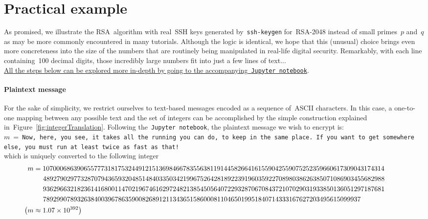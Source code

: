 \documentclass{article}
\begin{document}
\section{Practical example}
\label{sec::example}

\noindent As promised, we illustrate the RSA~algorithm with real~SSH keys generated by~\texttt{ssh-keygen} for~RSA-2048 instead of small primes~$p$ and~$q$ as may be more commonly encountered in many tutorials.  Although the logic is identical, we hope that this (unusual) choice brings even more concreteness into the size of the numbers that are routinely being manipulated in real-life digital security. Remarkably, with each line containing~100 decimal digits, those incredibly large numbers fit into just a few lines of text... \\

\noindent \href{https://github.com/Ranlot/public-key-encryption}{All the steps below can be explored more in-depth by going to the accompanying~\texttt{Jupyter notebook}}.

\paragraph{Plaintext message}  For the sake of simplicity, we restrict ourselves to text-based messages encoded as a sequence of~ASCII characters.  In this case, a one-to-one mapping between any possible text and the set of integers can be accomplished by the simple construction explained in~Figure~\ref{fig:integerTranslation}.  Following the~\texttt{Jupyter notebook}, the plaintext message we wish to encrypt is: \\

\noindent $m$~=~\texttt{Now, here, you see, it takes all the running you can do, to keep in the same place. If you want to get somewhere else, you must run at least twice as fast as that!} \\

\noindent which is uniquely converted to the following integer
\begin{align*}
\hspace*{-1cm} m &= 1070006863906557773181753244912151369846678355638119144582664161559042559075252359660617309043174314 \\
\hspace*{-1cm} & \hspace{0.48cm} 4892790297732870794365932048514840335034219967526428189223919603592270898038626385071086903455682988 \\
\hspace*{-1cm} & \hspace{0.48cm} 9362966321823614168001147021967461629724821385450564072293287067084372107029031933850136051297187681 \\
\hspace*{-1cm} & \hspace{0.48cm} 789299078932638400396786359008268912113436515860008110465019951840714333167627203495615099937 \\
\hspace*{-1cm} \big( m&\approx 1.07 \times 10^{392} \big)
\end{align*}
\end{document}
